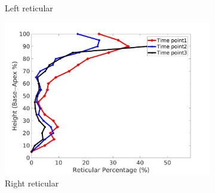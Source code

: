 \begin{figure}[H]
\begin{subfigure}{.42\linewidth}
  \caption{Left reticular}
  \label{fig:IPF5DiseaseAgainstHeight-c} 
\end{subfigure} 
\begin{subfigure}{.42\linewidth}%
  \includegraphics[width=\linewidth,trim={{.0\wd0} {.0\wd0} {.0\wd0} {.0\wd0}},clip]{Appendix/Image_AppexA/BaseToApex/IPF5RightLungReticularDiseaseAgainstHeight.jpg}
  \caption{Right reticular}
  \label{fig:IPF5DiseaseAgainstHeight-d}
\end{subfigure}
\begin{subfigure}{.42\linewidth}%

\end{subfigure}
\end{figure}
